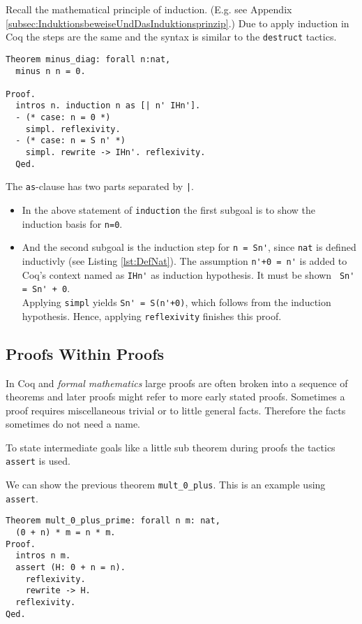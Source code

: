 Recall the mathematical principle of induction. (E.g. see Appendix \ref{subsec:InduktionsbeweiseUndDasInduktionsprinzip}.)
Due to apply induction in Coq the steps are the same and the syntax is similar to the \lstinline!destruct! tactics.
 

\begin{lstlisting}[caption = \lstinline!minus_diag!, label =lst:minus_diag] 
Theorem minus_diag: forall n:nat,
  minus n n = 0.
  
Proof.
  intros n. induction n as [| n' IHn'].
  - (* case: n = 0 *)
    simpl. reflexivity.
  - (* case: n = S n' *)
    simpl. rewrite -> IHn'. reflexivity.  
  Qed.
\end{lstlisting}

The \lstinline!as!-clause has two parts separated by \lstinline!|!.
\begin{itemize}
	\item In the above statement of \lstinline!induction! the first subgoal is to show the induction basis for \lstinline!n=0!.
	\item And the second subgoal is the induction step for \lstinline!n = Sn'!, since \lstinline!nat! is defined inductivly (see Listing  \ref{lst:DefNat}).
	      The assumption \lstinline!n'+0 = n'! is added to Coq's context named as \lstinline!IHn'! as induction hypothesis.
		  It must be shown \lstinline! Sn' = Sn' + 0!. \\
          Applying \lstinline!simpl! yields \lstinline!Sn' = S(n'+0)!, which follows from the induction hypothesis. 
          Hence, applying \lstinline!reflexivity! finishes this proof.
\end{itemize} 

\subsection{Proofs Within Proofs}

In Coq and {\itshape formal mathematics} large proofs are often broken into a sequence of theorems and later proofs might refer to more early stated proofs.
Sometimes a proof requires miscellaneous trivial or to little general facts. 
Therefore the facts sometimes do not need a name.

To state intermediate goals like a little sub theorem during proofs the tactics \lstinline!assert! is used.


\begin{example}
We can show the previous theorem \lstinline!mult_0_plus!. 
This is an example using \lstinline!assert!. 

\begin{lstlisting}[caption = \lstinline!mult_0_plus'!, label = lst:mult_0_plus_prime]
Theorem mult_0_plus_prime: forall n m: nat,
  (0 + n) * m = n * m. 
Proof.
  intros n m.
  assert (H: 0 + n = n).  
  	reflexivity. 
  	rewrite -> H.
  reflexivity.  
Qed.
\end{lstlisting}
\end{example}

